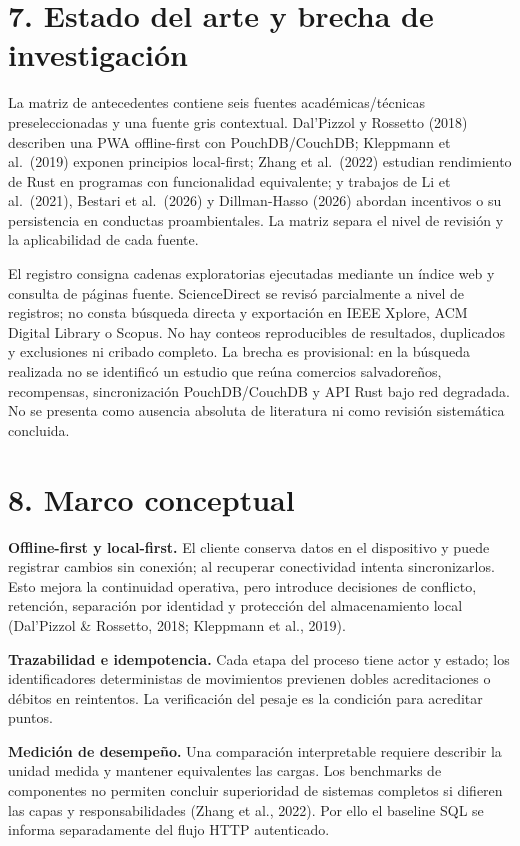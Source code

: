 \documentclass[
  spanish,
  12pt,
  a4paper,
]{article}
\begin{document}
\section{7. Estado del arte y brecha de
investigación}\label{estado-del-arte-y-brecha-de-investigaciuxf3n}

La matriz de antecedentes contiene seis fuentes académicas/técnicas
preseleccionadas y una fuente gris contextual. Dal'Pizzol y Rossetto
(2018) describen una PWA offline-first con PouchDB/CouchDB; Kleppmann et
al.~(2019) exponen principios local-first; Zhang et al.~(2022) estudian
rendimiento de Rust en programas con funcionalidad equivalente; y
trabajos de Li et al.~(2021), Bestari et al.~(2026) y Dillman-Hasso
(2026) abordan incentivos o su persistencia en conductas proambientales.
La matriz separa el nivel de revisión y la aplicabilidad de cada fuente.

El registro consigna cadenas exploratorias ejecutadas mediante un índice
web y consulta de páginas fuente. ScienceDirect se revisó parcialmente a
nivel de registros; no consta búsqueda directa y exportación en IEEE
Xplore, ACM Digital Library o Scopus. No hay conteos reproducibles de
resultados, duplicados y exclusiones ni cribado completo. La brecha es
provisional: en la búsqueda realizada no se identificó un estudio que
reúna comercios salvadoreños, recompensas, sincronización
PouchDB/CouchDB y API Rust bajo red degradada. No se presenta como
ausencia absoluta de literatura ni como revisión sistemática concluida.

\section{8. Marco conceptual}\label{marco-conceptual}

\textbf{Offline-first y local-first.} El cliente conserva datos en el
dispositivo y puede registrar cambios sin conexión; al recuperar
conectividad intenta sincronizarlos. Esto mejora la continuidad
operativa, pero introduce decisiones de conflicto, retención, separación
por identidad y protección del almacenamiento local (Dal'Pizzol \&
Rossetto, 2018; Kleppmann et al., 2019).

\textbf{Trazabilidad e idempotencia.} Cada etapa del proceso tiene actor
y estado; los identificadores deterministas de movimientos previenen
dobles acreditaciones o débitos en reintentos. La verificación del
pesaje es la condición para acreditar puntos.

\textbf{Medición de desempeño.} Una comparación interpretable requiere
describir la unidad medida y mantener equivalentes las cargas. Los
benchmarks de componentes no permiten concluir superioridad de sistemas
completos si difieren las capas y responsabilidades (Zhang et al.,
2022). Por ello el baseline SQL se informa separadamente del flujo HTTP
autenticado.
\end{document}
